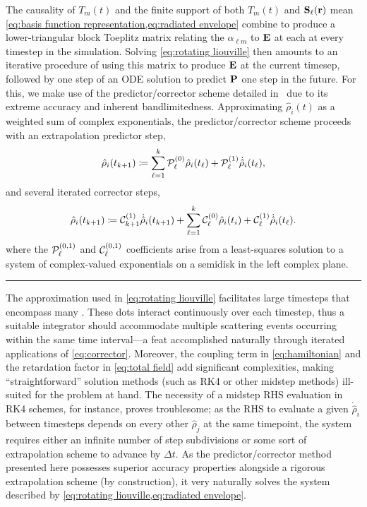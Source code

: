The causality of $T_m(t)$ and the finite support of both $T_m(t)$ and $\vb{S}_\ell(\vb{r})$ mean \cref{eq:basis function representation,eq:radiated envelope} combine to produce a lower-triangular block Toeplitz matrix relating the $\alpha_{\ell m}$ to $\vb{E}$ at each \qd{} at every timestep in the simulation.
Solving \cref{eq:rotating liouville} then amounts to an iterative procedure of using this matrix to produce $\vb{E}$ at the current timesep, followed by one step of an ODE solution to predict $\vb{P}$ one step in the future.
For this, we make use of the predictor/corrector scheme detailed in~\cite{Glaser2009} due to its extreme accuracy and inherent bandlimitedness.
Approximating $\hat{\rho}_i(t)$ as a weighted sum of complex exponentials, the predictor/corrector scheme proceeds with an extrapolation predictor step,
\begin{equation}
  \hat{\rho}_i(t_{k + 1}) \coloneqq \sum_{\ell = 1}^k \mathcal{P}_\ell^{\qty(0)} \hat{\rho}_i(t_\ell) + \mathcal{P}_\ell^{\qty(1)} \dot{\hat{\rho}}_i(t_\ell),
  \label{eq:predictor}
\end{equation}
and several iterated corrector steps,
\begin{equation}
  \hat{\rho}_i(t_{k + 1}) \coloneqq \mathcal{C}_{k+1}^{\qty(1)} \dot{\hat{\rho}}_i(t_{k + 1}) + \sum_{\ell = 1}^k \mathcal{C}_\ell^{\qty(0)} \hat{\rho}_i(t_i) + \mathcal{C}_\ell^{\qty(1)} \dot{\hat{\rho}}_i(t_\ell).
  \label{eq:corrector}
\end{equation}
where the $\mathcal{P}_\ell^{\qty(0, 1)}$ and $\mathcal{C}_\ell^{\qty(0, 1)}$ coefficients arise from a least-squares solution to a system of complex-valued exponentials on a semidisk in the left complex plane.

\noindent\rule[0.5ex]{\linewidth}{1pt}

The approximation used in \cref{eq:rotating liouville} facilitates large timesteps that encompass many \qds{}.
These dots interact continuously over each timestep, thus a suitable integrator should accommodate multiple scattering events occurring within the same time interval---a feat accomplished naturally through iterated applications of \cref{eq:corrector}.
Moreover, the coupling term in \cref{eq:hamiltonian} and the retardation factor in \cref{eq:total field} add significant complexities, making ``straightforward'' solution methods (such as RK4 or other midstep methods) ill-suited for the problem at hand.
The necessity of a midstep RHS evaluation in RK4 schemes, for instance, proves troublesome; as the RHS to evaluate a given $\dot{\hat{\rho}}_i$ between timesteps depends on every other $\hat{\rho}_j$ at the same timepoint, the system requires either an infinite number of step subdivisions or some sort of extrapolation scheme to advance by $\Delta t$.
As the predictor/corrector method presented here possesses superior accuracy properties alongside a rigorous extrapolation scheme (by construction), it very naturally solves the system described by \cref{eq:rotating liouville,eq:radiated envelope}.

